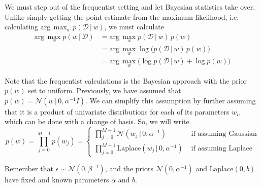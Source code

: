 \documentclass{article}
\begin{document}
    We must step out of the frequentist setting and let Bayesian statistics take over. Unlike simply getting the point estimate from the maximum likelihood, i.e. calculating $\text{arg}\, \max_w p(\mathcal{D}\,|\,w)$, we must calculate
    \begin{align*}
      \text{arg}\, \max_w p(w\,|\,\mathcal{D}) & = \text{arg}\, \max_w p(\mathcal{D}\,|\, w)\, p(w) \\
      & = \text{arg}\, \max_w \log\big(p(\mathcal{D}\,|\, w)\, p(w)) \\
      & = \text{arg}\, \max_w \Big( \log{p(\mathcal{D}\,|\,w)} + \log{p(w)} \Big)
    \end{align*}

    Note that the frequentist calculations is the Bayesian approach with the prior $p(w)$ set to uniform. Previously, we have assumed that $p(w) = \mathcal{N}(w\,|\, 0, \alpha^{-1} I)$. We can simplify this assumption by further assuming that it is a product of univariate distributions for each of its parameters $w_i$, which can be done with a change of basis. So, we will write
    \begin{equation}
      p(w) = \prod_{j=0}^{M-1} p(w_j) = \begin{cases}
        \prod_{j=0}^{M-1} \mathcal{N}(w_j \,|\,0, \alpha^{-1}) & \text{ if assuming Gaussian} \\
        \prod_{j=0}^{M-1} \text{Laplace}(w_j \,|\,0, \alpha^{-1}) & \text{ if assuming Laplace}
      \end{cases}
    \end{equation}

    Remember that $\epsilon \sim \mathcal{N}(0, \beta^{-1})$, and the priors $\mathcal{N}(0, \alpha^{-1})$ and $\text{Laplace}(0, b)$ have fixed and known parameters $\alpha$ and $b$.
\end{document}
